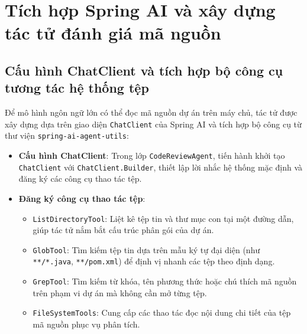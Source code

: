 \documentclass[12pt,a4paper]{report}
\begin{document}
\section{Tích hợp Spring AI và xây dựng tác tử đánh giá mã nguồn}

\subsection{Cấu hình ChatClient và tích hợp bộ công cụ tương tác hệ thống tệp}
Để mô hình ngôn ngữ lớn có thể đọc mã nguồn dự án trên máy chủ, tác tử được xây dựng dựa trên giao diện \texttt{ChatClient} của Spring AI và tích hợp bộ công cụ từ thư viện \texttt{spring-ai-agent-utils}:
\begin{itemize}
    \item \textbf{Cấu hình ChatClient}: Trong lớp \texttt{CodeReviewAgent}, tiến hành khởi tạo \texttt{ChatClient} với \texttt{ChatClient.Builder}, thiết lập lời nhắc hệ thống mặc định và đăng ký các công cụ thao tác tệp.
    \item \textbf{Đăng ký công cụ thao tác tệp}:
    \begin{itemize}
        \item \texttt{ListDirectoryTool}: Liệt kê tệp tin và thư mục con tại một đường dẫn, giúp tác tử nắm bắt cấu trúc phân gói của dự án.
        \item \texttt{GlobTool}: Tìm kiếm tệp tin dựa trên mẫu ký tự đại diện (như \texttt{**/*.java}, \texttt{**/pom.xml}) để định vị nhanh các tệp theo định dạng.
        \item \texttt{GrepTool}: Tìm kiếm từ khóa, tên phương thức hoặc chú thích mã nguồn trên phạm vi dự án mà không cần mở từng tệp.
        \item \texttt{FileSystemTools}: Cung cấp các thao tác đọc nội dung chi tiết của tệp mã nguồn phục vụ phân tích.
    \end{itemize}
\end{itemize}
\end{document}
